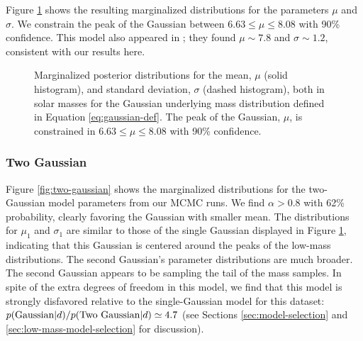 \documentclass[preprint]{aastex}
\begin{document}
Figure \ref{fig:gaussian} shows the resulting marginalized
distributions for the parameters $\mu$ and $\sigma$.  We constrain the
peak of the Gaussian between $6.63 \leq \mu \leq 8.08$ with 90\%
confidence.  This model also appeared in \citet{Ozel2010}; they found
$\mu \sim 7.8$ and $\sigma \sim 1.2$, consistent with our results
here.

\begin{figure}
  \begin{center}
  \end{center}
  \caption{\label{fig:gaussian} Marginalized posterior distributions
    for the mean, $\mu$ (solid histogram), and standard deviation,
    $\sigma$ (dashed histogram), both in solar masses for the Gaussian
    underlying mass distribution defined in Equation
    \eqref{eq:gaussian-def}.  The peak of the Gaussian, $\mu$, is
    constrained in $6.63 \leq \mu \leq 8.08$ with 90\% confidence.}
\end{figure}

\subsubsection{Two Gaussian}

Figure \ref{fig:two-gaussian} shows the marginalized distributions for
the two-Gaussian model parameters from our MCMC runs.  We find $\alpha
> 0.8$ with 62\% probability, clearly favoring the Gaussian with
smaller mean.  The distributions for $\mu_1$ and $\sigma_1$ are
similar to those of the single Gaussian displayed in Figure
\ref{fig:gaussian}, indicating that this Gaussian is centered around
the peaks of the low-mass distributions.  The second Gaussian's
parameter distributions are much broader.  The second Gaussian appears
to be sampling the tail of the mass samples.  In spite of the extra
degrees of freedom in this model, we find that this model is strongly
disfavored relative to the single-Gaussian model for this dataset:
$p(\textnormal{Gaussian}|d) / p(\textnormal{Two Gaussian}|d) \simeq
4.7$ (see Sections \ref{sec:model-selection} and
\ref{sec:low-mass-model-selection} for discussion).
\end{document}
